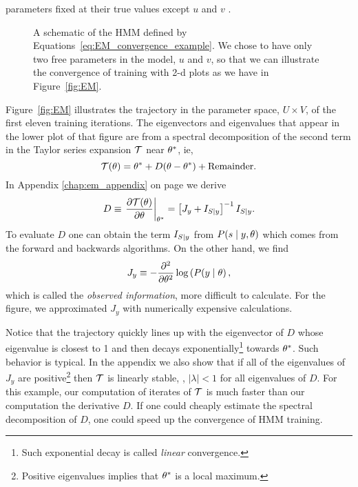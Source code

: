 parameters fixed at their true values except $u$ and $v$ .
\begin{figure}[htbp]
  \caption[An HMM with only two parameters.]%
  {A schematic of the HMM defined by
    Equations~\eqref{eq:EM_convergence_example}.  We chose to have only two
    free parameters in the model, $u$ and $v$, so that we can
    illustrate the convergence of training with 2-d plots as we have
    in Figure~\ref{fig:EM}.}
  \label{fig:EMxfig}
\end{figure}
      
Figure~\ref{fig:EM} illustrates the trajectory in the parameter space,
$U \times V$, of the first eleven training iterations.  The
eigenvectors and eigenvalues that appear in the lower plot of that
figure are from a spectral decomposition of the second term in the
Taylor series expansion $\EMmap$ near ${\theta^*}$, ie,
\begin{equation*}
  \EMmap(\parameters) = \EMfixedPoint + D  (\parameters - \EMfixedPoint) +
             \text{Remainder.}
\end{equation*}
In Appendix \ref{chap:em_appendix} on page
\pageref{eq:information_em_derivative} we derive
\begin{equation*}
  D \equiv \left.\frac{\partial \EMmap(\parameters)}{\partial \parameters}
  \right|_\EMfixedPoint = \left[J_y + I_{S|y}  \right]^{-1} I_{S|y}.
\end{equation*}
To evaluate $D$ one can obtain the term $I_{S\mid y}$ from
$P(s\mid y, \theta)$ which comes from the forward and backwards
algorithms.  On the other hand, we find
\begin{equation*}
  J_y \equiv -\frac{\partial^2}{\partial \theta^2} \log \left( P(y \mid
    \theta \right),
\end{equation*}
which is called the \emph{observed information}, more difficult to
calculate.  For the figure, we approximated $J_y$ with numerically
expensive calculations.

Notice that the trajectory quickly lines up with the eigenvector of
$D$ whose eigenvalue is closest to 1 and then decays
exponentially\footnote{Such exponential decay is called \emph{linear}
  convergence.}  towards ${\theta^*}$.  Such behavior is typical.
In the appendix we also show that if all of the eigenvalues of $J_y$
are positive\footnote{Positive eigenvalues implies that
  ${\theta^*}$ is a local maximum.} then $\EMmap$ is linearly
stable, \ie, $\left| \lambda \right| < 1$ for all eigenvalues of $D$.
For this example, our computation of iterates of $\EMmap$ is much
faster than our computation the derivative $D$.  If one could cheaply
estimate the spectral decomposition of $D$, one could speed up the
convergence of HMM training.

